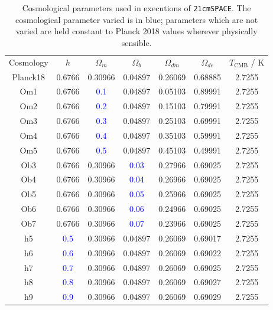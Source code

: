 \documentclass[floats,floatfix,showpacs,amssymb,prd,superscriptaddress,nofootinbib]{revtex4-2} %
\newcommand{\code}{\texttt}
\newcommand{\blue}{\textcolor{blue}}
\begin{document}
\begin{table}[H]
\centering
\begin{tabular}{c c c c c c c}
\hline
Cosmology & $h$ & $\Omega_m$ & $\Omega_b$ & $\Omega_{dm}$ & $\Omega_{de}$ & $T_{\text{CMB}}$ / K \\
\hhline{= = = = = = =}
Planck18 & 0.6766 & 0.30966 & 0.04897 & 0.26069 & 0.68885 & 2.7255 \\ \hline
Om1 & 0.6766 & \blue{0.1} & 0.04897 & 0.05103 & 0.89991 & 2.7255 \\
Om2 & 0.6766 & \blue{0.2} & 0.04897 & 0.15103 & 0.79991 & 2.7255 \\
Om3 & 0.6766 & \blue{0.3} & 0.04897 & 0.25103 & 0.69991 & 2.7255 \\
Om4 & 0.6766 & \blue{0.4} & 0.04897 & 0.35103 & 0.59991 & 2.7255 \\
Om5 & 0.6766 & \blue{0.5} & 0.04897 & 0.45103 & 0.49991 & 2.7255 \\ \hline
Ob3 & 0.6766 & 0.30966 & \blue{0.03} & 0.27966 & 0.69025 & 2.7255 \\
Ob4 & 0.6766 & 0.30966 & \blue{0.04} & 0.26966 & 0.69025 & 2.7255 \\
Ob5 & 0.6766 & 0.30966 & \blue{0.05} & 0.25966 & 0.69025 & 2.7255 \\
Ob6 & 0.6766 & 0.30966 & \blue{0.06} & 0.24966 & 0.69025 & 2.7255 \\
Ob7 & 0.6766 & 0.30966 & \blue{0.07} & 0.23966 & 0.69025 & 2.7255 \\
\hline
h5 & \blue{0.5} & 0.30966 & 0.04897 & 0.26069 & 0.69017 & 2.7255 \\
h6 & \blue{0.6} & 0.30966 & 0.04897 & 0.26069 & 0.69022 & 2.7255 \\
h7 & \blue{0.7} & 0.30966 & 0.04897 & 0.26069 & 0.69025 & 2.7255 \\
h8 & \blue{0.8} & 0.30966 & 0.04897 & 0.26069 & 0.69027 & 2.7255 \\
h9 & \blue{0.9} & 0.30966 & 0.04897 & 0.26069 & 0.69029 & 2.7255 \\
\hline

\end{tabular}
\caption{Cosmological parameters used in executions of \code{21cmSPACE}. The cosmological parameter varied is in blue; parameters which are not varied are held constant to Planck 2018 values \citep{Planck2018results} wherever physically sensible.}
\label{tab:ic_parameter_values}
\end{table}
\end{document}
